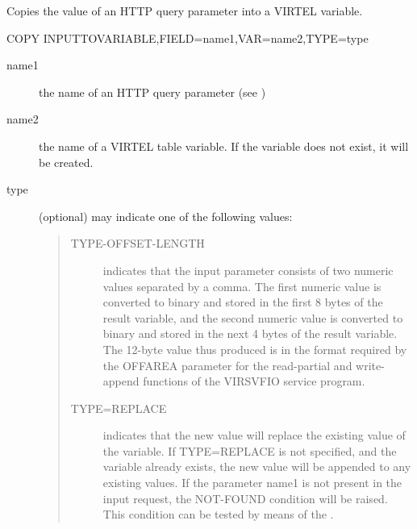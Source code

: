 \documentclass[letterpaper,10pt,english]{sphinxmanual}
\begin{document}

Copies the value of an HTTP query parameter into a VIRTEL variable.

\begin{sphinxVerbatim}[commandchars=\\\{\}]
COPY\PYGZdl{} INPUT\PYGZhy{}TO\PYGZhy{}VARIABLE,FIELD=\PYGZsq{}name1\PYGZsq{},VAR=\PYGZsq{}name2\PYGZsq{},TYPE=type
\end{sphinxVerbatim}
\begin{description}
\item[{name1}] \leavevmode
the name of an HTTP query parameter (see {\hyperref[\detokenize{User_Guide:v457ug-url-formats}]{}})

\item[{name2}] \leavevmode
the name of a VIRTEL table variable. If the variable does not exist, it will be created.

\item[{type}] \leavevmode
(optional) may indicate one of the following values:
\begin{quote}
\begin{description}
\item[{TYPE-OFFSET-LENGTH}] \leavevmode
indicates that the input parameter consists of two numeric values separated by a comma. The first numeric value is converted to binary and stored in the first 8 bytes of the result variable, and the second numeric value is converted to binary and stored in the next 4 bytes of the result variable. The 12-byte value thus produced is in the format required by the OFFAREA parameter for the read-partial and write-append functions of the VIRSVFIO service program.

\item[{TYPE=REPLACE}] \leavevmode
indicates that the new value will replace the existing value of the variable. If TYPE=REPLACE is not specified, and the variable already exists, the new value will be appended to any existing values. If the parameter name1 is not present in the input request, the NOT-FOUND condition will be raised. This condition can be tested by means of the {\hyperref[\detokenize{User_Guide:v457ug-if}]{}}.

\end{description}
\end{quote}

\end{description}
\end{document}
